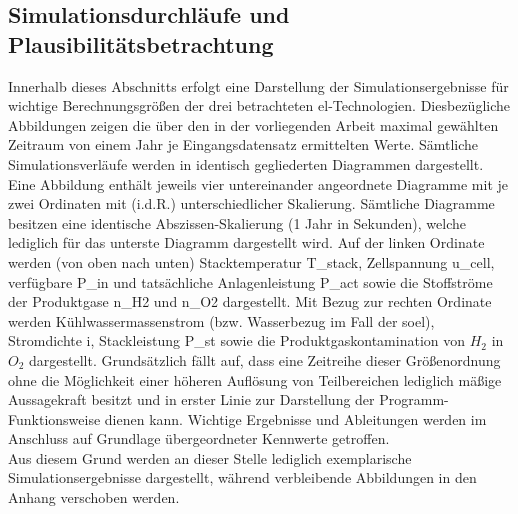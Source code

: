 \documentclass[onecolumn,10pt,titlepage]{article}
\begin{document}
\subsection{Simulationsdurchläufe und Plausibilitätsbetrachtung}
Innerhalb dieses Abschnitts erfolgt eine Darstellung der Simulationsergebnisse für wichtige Berechnungsgrößen der drei betrachteten \gls{el}-Technologien. Diesbezügliche Abbildungen zeigen die über den in der vorliegenden Arbeit maximal gewählten Zeitraum von einem Jahr je Eingangsdatensatz ermittelten Werte. %
Sämtliche Simulationsverläufe werden in identisch gegliederten Diagrammen dargestellt. Eine Abbildung enthält jeweils vier untereinander angeordnete Diagramme mit je zwei Ordinaten mit (i.d.R.) unterschiedlicher Skalierung. Sämtliche Diagramme besitzen eine identische Abszissen-Skalierung (1 Jahr in Sekunden), welche lediglich für das unterste Diagramm dargestellt wird. Auf der linken Ordinate werden (von oben nach unten) Stacktemperatur \gls{T_stack}, Zellspannung \gls{u_cell}, verfügbare \gls{P_in} und tatsächliche Anlagenleistung \gls{P_act} sowie die Stoffströme der Produktgase \gls{n_H2} und \gls{n_O2} dargestellt.
Mit Bezug zur rechten Ordinate werden Kühlwassermassenstrom (bzw. Wasserbezug im Fall der \gls{soel}), Stromdichte \gls{i}, Stackleistung \gls{P_st} sowie die Produktgaskontamination von $H_2$ in $O_2$ dargestellt.
Grundsätzlich fällt auf, dass eine Zeitreihe dieser Größenordnung ohne die Möglichkeit einer höheren Auflösung von Teilbereichen lediglich mäßige Aussagekraft besitzt und in erster Linie zur Darstellung der Programm-Funktionsweise dienen kann. Wichtige Ergebnisse und Ableitungen werden im Anschluss auf Grundlage übergeordneter Kennwerte getroffen.\\ %
Aus diesem Grund werden an dieser Stelle lediglich exemplarische Simulationsergebnisse dargestellt, während verbleibende Abbildungen in den Anhang verschoben werden.
  
\end{document}
